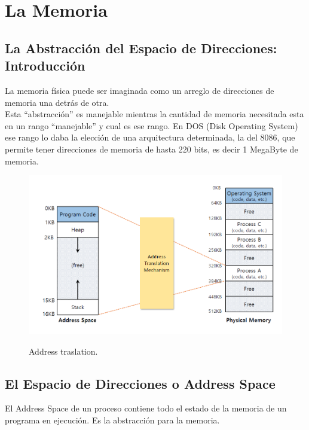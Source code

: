 \documentclass[../main.tex]{subfiles}
\begin{document}
\section{La Memoria}
    \subsection{La Abstracción del Espacio de Direcciones: Introducción}
        La memoria física puede ser imaginada como un arreglo de direcciones de memoria una detrás de otra.
        \\
        Esta “abstracción” es manejable mientras la cantidad de memoria necesitada esta en un rango “manejable” y cual es ese rango. En DOS (Disk Operating System) ese rango lo daba la elección de una arquitectura determinada, la del 8086, que permite tener direcciones de memoria de hasta 220
        bits, es decir 1 MegaByte de memoria.

        \begin{figure}[bh]
            \centering
            \includegraphics[scale=0.45]{../images/address_traslation_01.png}
            \label{fig:address_traslation_01}
            \caption{Address traslation.}
        \end{figure}

    \subsection{El Espacio de Direcciones o Address Space}
        El Address Space de un proceso contiene todo el estado de la memoria de un programa en ejecución. Es la abstracción para la memoria.\\
\end{document}
